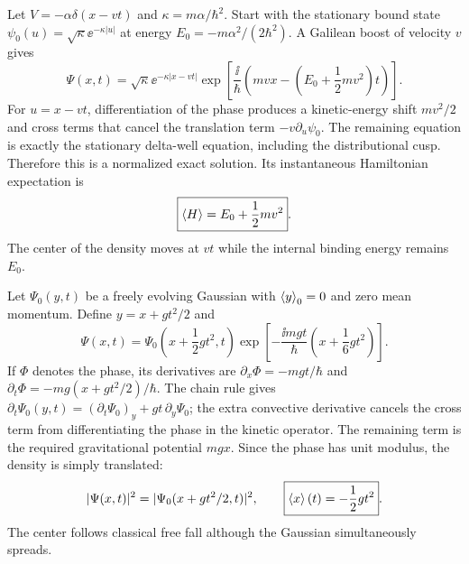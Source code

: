 Let $V=-\alpha\delta(x-vt)$ and
$\kappa=m\alpha/\hbar^2$.
Start with the stationary bound state
$\psi_0(u)=\sqrt\kappa\ee^{-\kappa|u|}$
at energy $E_0=-m\alpha^2/(2\hbar^2)$.
A Galilean boost of velocity $v$ gives
\begin{equation}
\boxed{\Psi(x,t)=
\sqrt\kappa\ee^{-\kappa|x-vt|}
\exp\left[\frac{\ii}{\hbar}
\left(mvx-\left(E_0+\frac12mv^2\right)t\right)\right]}.
\end{equation}
For $u=x-vt$, differentiation of the phase
produces a kinetic-energy shift $mv^2/2$
and cross terms that cancel the translation
term $-v\partial_u\psi_0$. The remaining
equation is exactly the stationary delta-well
equation, including the distributional cusp.
Therefore this is a normalized exact solution.
Its instantaneous Hamiltonian expectation is
\begin{equation}
\boxed{\left\langle H\right\rangle=E_0+\frac12mv^2}.
\end{equation}
The center of the density moves at $vt$ while
the internal binding energy remains $E_0$.

Let $\Psi_0(y,t)$ be a freely evolving Gaussian
with $\left\langle y\right\rangle_0=0$ and zero mean momentum.
Define $y=x+gt^2/2$ and
\begin{equation}
\boxed{\Psi(x,t)=
\Psi_0\left(x+\frac12gt^2,t\right)
\exp\left[-\frac{\ii mgt}{\hbar}
\left(x+\frac16gt^2\right)\right]}.
\end{equation}
If $\Phi$ denotes the phase, its derivatives are
$\partial_x\Phi=-mgt/\hbar$ and
$\partial_t\Phi=-mg(x+gt^2/2)/\hbar$.
The chain rule gives
$\partial_t\Psi_0(y,t)=
(\partial_t\Psi_0)_y+gt\,\partial_y\Psi_0$;
the extra convective derivative cancels the
cross term from differentiating the phase
in the kinetic operator. The remaining term
is the required gravitational potential $mgx$.
Since the phase has unit modulus, the density
is simply translated:
\begin{equation}
|\Psi(x,t)|^2=
|\Psi_0(x+gt^2/2,t)|^2,\qquad
\boxed{\left\langle x\right\rangle(t)=-\frac12gt^2}.
\end{equation}
The center follows classical free fall although
the Gaussian simultaneously spreads.

